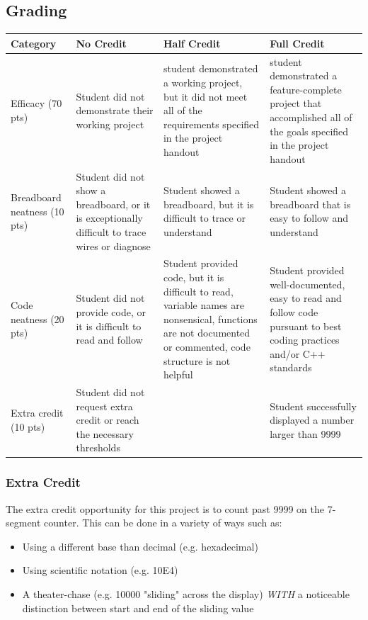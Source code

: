 \documentclass{article}
\begin{document}
    \subsection*{Grading}
    \begin{tabular}{ | p{1in} | p{1.75in} | p{1.75in} | p{1.75in} | }
        \hline
        \textbf{Category} & \textbf{No Credit} & \textbf{Half Credit} & \textbf{Full Credit} \\

        \hline
        Efficacy (70 pts) & 
        Student did not demonstrate their working project & 
        student demonstrated a working project, but it did not meet all of the requirements specified in the project handout & 
        student demonstrated a feature-complete project that accomplished all of the goals specified in the project handout \\
        \hline
        Breadboard neatness (10 pts) & 
        Student did not show a breadboard, or it is exceptionally difficult to trace wires or diagnose &
        Student showed a breadboard, but it is difficult to trace or understand &
        Student showed a breadboard that is easy to follow and understand \\
        \hline
        Code neatness (20 pts) & 
        Student did not provide code, or it is difficult to read and follow &
        Student provided code, but it is difficult to read, variable names are nonsensical, functions are not documented or commented, code structure is not helpful &
        Student provided well-documented, easy to read and follow code pursuant to best coding practices and/or C++ standards \\
        \hline
        Extra credit (10 pts) &
        Student did not request extra credit or reach the necessary thresholds & 
        &
        Student successfully displayed a number larger than 9999 \\

        \hline
    \end{tabular}

        \subsubsection*{Extra Credit}
        The extra credit opportunity for this project is to count past 9999 on the 7-segment counter.
        This can be done in a variety of ways such as:
        
        \begin{itemize}
            \item Using a different base than decimal (e.g. hexadecimal)
            \item Using scientific notation (e.g. 10E4)
            \item A theater-chase (e.g. 10000 "sliding" across the display) \textit{WITH} a noticeable distinction between start and end of the sliding value
        \end{itemize}
\end{document}
